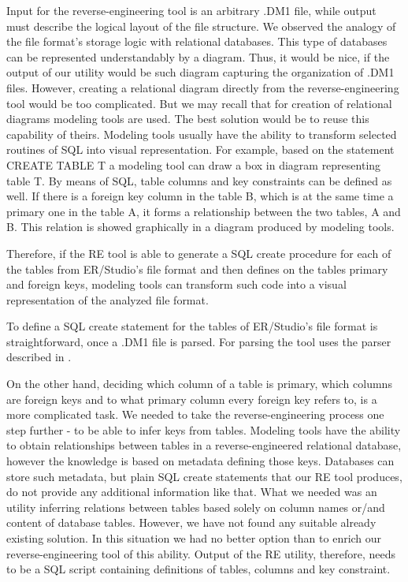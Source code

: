 Input for the reverse-engineering tool is an arbitrary .DM1 file, while output must describe the logical layout of the file structure.
We observed the analogy of the file format's storage logic with relational databases. 
This type of databases can be represented understandably by a diagram.
Thus, it would be nice, if the output of our utility would be such diagram capturing the organization of .DM1 files.
However, creating a relational diagram directly from the reverse-engineering tool would be too complicated. But we may recall that for creation of relational diagrams modeling tools are used. The best solution would be to reuse this capability of theirs.
Modeling tools usually have the ability to transform selected routines of SQL into visual representation.
For example, based on the statement CREATE TABLE T a modeling tool can draw a box in diagram representing table T. 
By means of SQL, table columns and key constraints can be defined as well.
If there is a foreign key column in the table B, which is at the same time a primary one in the table A, it forms a relationship between the two tables, A and B. This relation is showed graphically in a diagram produced by modeling tools.

Therefore, if the RE tool is able to generate a SQL create procedure for each of the tables from ER/Studio's file format and then defines on the tables primary and foreign keys, modeling tools can transform such code into a visual representation of the analyzed file format.

To define a SQL create statement for the tables of ER/Studio's file format is straightforward, once a .DM1 file is parsed. For parsing the tool uses the parser described in .

On the other hand, deciding which column of a table is primary, which columns are foreign keys and to what primary column every foreign key refers to, is a more complicated task.
We needed to take the reverse-engineering process one step further - to be able to infer keys from tables.
Modeling tools have the ability to obtain relationships between tables in a reverse-engineered relational database, however the knowledge is based on metadata defining those keys. Databases can store such metadata, but plain SQL create statements that our RE tool produces, do not provide any additional information like that.
What we needed was an utility inferring relations between tables based solely on column names or/and content of database tables. However, we have not found any suitable already existing solution.
In this situation we had no better option than to enrich our reverse-engineering tool of this ability.
Output of the RE utility, therefore, needs to be a SQL script containing definitions of tables, columns and key constraint.


